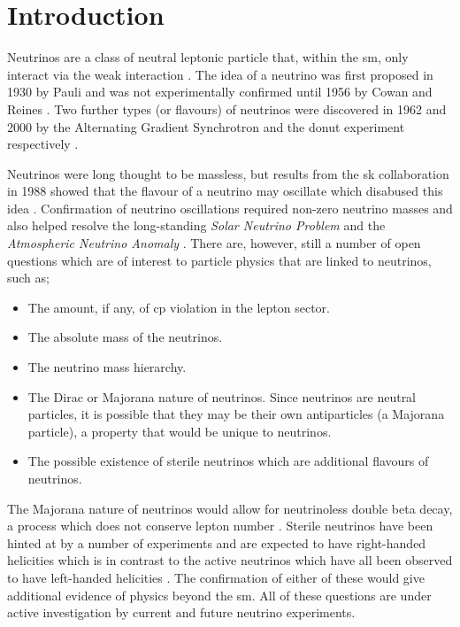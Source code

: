 \chapter{Introduction}
\label{chap:Introduction}


Neutrinos are a class of neutral leptonic particle that, within the \gls{sm}, only interact via the weak interaction \cite{Particles_and_Fundamental_Interactions:_An_Introduction_to_Particle_Physics}. The idea of a neutrino was first proposed in 1930 by Pauli and was not experimentally confirmed until 1956 by Cowan and Reines \cite{Pauli_letter} \cite{cowan_and_reines_paper}. Two further types (or flavours) of neutrinos were discovered in 1962 and 2000 by the Alternating Gradient Synchrotron and the \Gls{donut} experiment respectively \cite{Muon_neutrino_discovery} \cite{DONUT}. 

Neutrinos were long thought to be massless, but results from the \gls{sk} collaboration in 1988 showed that the flavour of a neutrino may oscillate which disabused this idea \cite{SuperK_neutrino_oscillations}. Confirmation of neutrino oscillations required non-zero neutrino masses and also helped resolve the long-standing \textit{Solar Neutrino Problem} and the \textit{Atmospheric Neutrino Anomaly} \cite{Homestake} \cite{Atmospheric_anomaly}. There are, however, still a number of open questions which are of interest to particle physics that are linked to neutrinos, such as; 
\begin{itemize}
    \item The amount, if any, of \gls{cp} violation in the lepton sector.
    \item The absolute mass of the neutrinos.
    \item The neutrino mass hierarchy. 
    \item The Dirac or Majorana nature of neutrinos. Since neutrinos are neutral particles, it is possible that they may be their own antiparticles (a Majorana particle), a property that would be unique to neutrinos. 
    \item The possible existence of sterile neutrinos which are additional flavours of neutrinos. 
\end{itemize}
The Majorana nature of neutrinos would allow for neutrinoless double beta decay, a process which does not conserve lepton number \cite{neutrinoless_double_beta_decay}. Sterile neutrinos have been hinted at by a number of experiments and are expected to have right-handed helicities which is in contrast to the active neutrinos which have all been observed to have left-handed helicities \cite{White_Paper}. The confirmation of either of these would give additional evidence of physics beyond the \gls{sm}. All of these questions are under active investigation by current and future neutrino experiments. 

